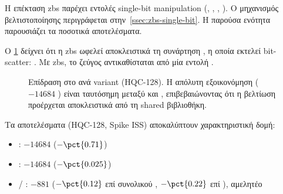 
Η επέκταση \gls{zbs} παρέχει εντολές single-bit manipulation
(, , , ). Ο μηχανισμός
βελτιστοποίησης περιγράφεται στην~\cref{ssec:zbs-single-bit}. Η παρούσα
ενότητα παρουσιάζει τα ποσοτικά αποτελέσματα.

Ο \cref{fig:zbs-ablation} δείχνει ότι η \gls{zbs} ωφελεί αποκλειστικά
τη συνάρτηση , η οποία εκτελεί
bit-scatter: . Με \gls{zbs}, το
ζεύγος  αντικαθίσταται από μία εντολή .

\begin{figure}[htbp]
  \centering
  
  \caption[Επίδραση Zbs στο Decaps instret ανά variant (HQC-128)]{Επίδραση  στο \Decaps \instret ανά variant (HQC-128).
    Η απόλυτη εξοικονόμηση ($-\num{14684}$ \instret) είναι ταυτόσημη
    μεταξύ  και , επιβεβαιώνοντας
    ότι η βελτίωση προέρχεται αποκλειστικά από τη shared
     βιβλιοθήκη.}
  \label{fig:zbs-ablation}
\end{figure}

Τα αποτελέσματα (HQC-128, Spike ISS) αποκαλύπτουν χαρακτηριστική δομή:

\begin{itemize}
  \item {} \Decaps: $-\num{14684}$ \instret ($-\pct{0.71}$)
  \item {} \Decaps: $-\num{14684}$ \instret ($-\pct{0.025}$)
  \item {} / : $-\num{881}$ \instret
        ($-\pct{0.12}$ επί συνολικού \KEM, $-\pct{0.22}$ επί \Decaps), αμελητέο
\end{itemize}

